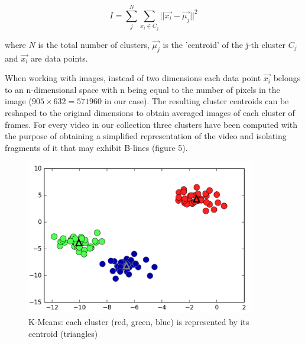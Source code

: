 \documentclass[11pt]{article} %
\begin{document}
	\[ I = \sum_j^N \sum_{x_i \in C_j} || \vec{x_i} - \vec{ \mu_j} ||^2 \]
	
	where $N$ is the total number of clusters, $\vec{\mu_j}$ is the 'centroid' of the j-th cluster $C_j$ and $\vec{x_i}$ are data points.
	
	When working with images, instead of two dimensions each data point $\vec{x_i}$ belongs to an n-dimensional space with n being equal to the number of pixels in the image ($905 \times 632=571960$ in our case). The resulting cluster centroids can be reshaped to the original dimensions to obtain averaged images of each cluster of frames. For every video in our collection three clusters have been computed with the purpose of obtaining a simplified representation of the video and isolating fragments of it that may exhibit B-lines (figure 5). 
	
	\begin{figure}
	\centering
	\includegraphics[width=10cm]{figuras/clusters.png}
	\caption{K-Means: each cluster (red, green, blue) is represented by its centroid (triangles)\cite{python}}
	\end{figure}
	
\end{document}
